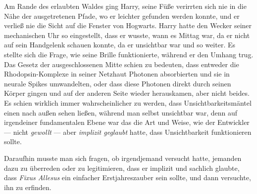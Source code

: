 Am Rande des erlaubten Waldes ging Harry, seine Füße verirrten sich nie in die Nähe der ausgetretenen Pfade, wo er leichter gefunden werden konnte, und er verließ nie die Sicht auf die Fenster von Hogwarts. Harry hatte den Wecker seiner mechanischen Uhr so eingestellt, dass er wusste, wann es Mittag war, da er nicht auf sein Handgelenk schauen konnte, da er unsichtbar war und so weiter. Es stellte sich die Frage, wie seine Brille funktionierte, während er den Umhang trug. Das Gesetz der ausgeschlossenen Mitte schien zu bedeuten, dass entweder die Rhodopsin-Komplexe in seiner Netzhaut Photonen absorbierten und sie in neurale Spikes umwandelten, oder dass diese Photonen direkt durch seinen Körper gingen und auf der anderen Seite wieder herauskamen, aber nicht beides. Es schien wirklich immer wahrscheinlicher zu werden, dass Unsichtbarkeitsmäntel einen nach außen sehen ließen, während man selbst unsichtbar war, denn auf irgendeiner fundamentalen Ebene war das die Art und Weise, wie der Entwickler — nicht \emph{gewollt} — aber \emph{implizit geglaubt} hatte, dass Unsichtbarkeit funktionieren sollte.

Daraufhin musste man sich fragen, ob irgendjemand versucht hatte, jemanden dazu zu überreden oder zu legitimieren, dass er implizit und sachlich glaubte, dass \emph{Fixus Allesus} ein einfacher Erstjahreszauber sein sollte, und dann versuchte, ihn zu erfinden.

